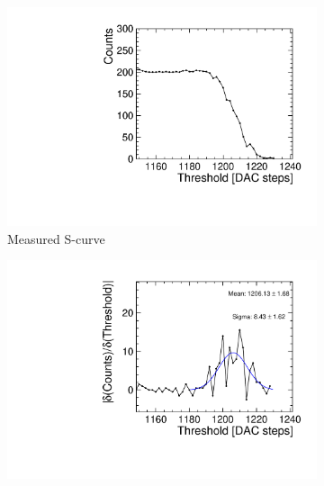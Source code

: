 \begin{figure}[htbp] \centering
  \begin{subfigure}[b]{0.45\textwidth}
    \includegraphics[width=\textwidth]{./figures/Calibration/W5_E2_scurve_ampl1.pdf}
    \caption{Measured S-curve}
    \label{fig:scurve_example}
  \end{subfigure} \hfill
  \begin{subfigure}[b]{0.45\textwidth}
    \includegraphics[width=\textwidth]{./figures/Calibration/W5_E2_deriv_scurve_ampl1.pdf}

\end{subfigure}
\end{figure}
